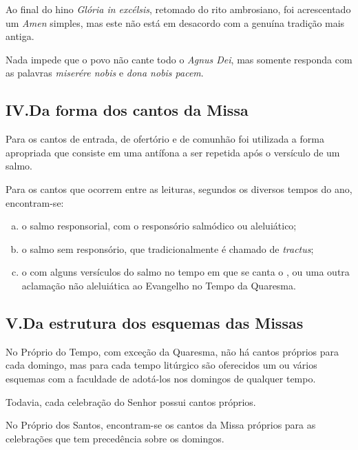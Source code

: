  Ao final do hino \textcolor{gregoriocolor}{\emph{Glória in excélsis}}, retomado do rito ambrosiano, foi acrescentado um \textcolor{gregoriocolor}{\emph{Amen}} simples, mas este não está em desacordo com a genuína tradição mais antiga.

 Nada impede que o povo não cante todo o \textcolor{gregoriocolor}{\emph{Agnus Dei}}, mas somente responda com as palavras \textcolor{gregoriocolor}{\emph{miserére nobis}} e \textcolor{gregoriocolor}{\emph{dona nobis pacem}}.

\subsection{IV.\@ Da forma dos cantos da Missa}

 Para os cantos de entrada, de ofertório e de comunhão foi utilizada a forma apropriada que consiste em uma antífona a ser repetida após o versículo de um salmo.

 Para os cantos que ocorrem entre as leituras, segundos os diversos tempos do ano, encontram-se:
\begin{enumerate}[a)]
  \item o salmo responsorial, com o responsório salmódico ou aleluiático;

  \item o salmo sem responsório, que tradicionalmente é chamado de \emph{tractus};

  \item o {\Al} com alguns versículos do salmo no tempo em que se canta o \textcolor{gregoriocolor}{\Al}, ou uma outra aclamação não aleluiática ao Evangelho no Tempo da Quaresma.
\end{enumerate}

\subsection{V.\@ Da estrutura dos esquemas das Missas}\label{subsection:praenotanda-5}

 No Próprio do Tempo, com exceção da Quaresma, não há cantos próprios para cada domingo, mas para cada tempo litúrgico são oferecidos um ou vários esquemas com a faculdade de adotá-los nos domingos de qualquer tempo. 

Todavia, cada celebração do Senhor possui cantos próprios.

 No Próprio dos Santos, encontram-se os cantos da Missa próprios para as celebrações que tem precedência sobre os domingos.

